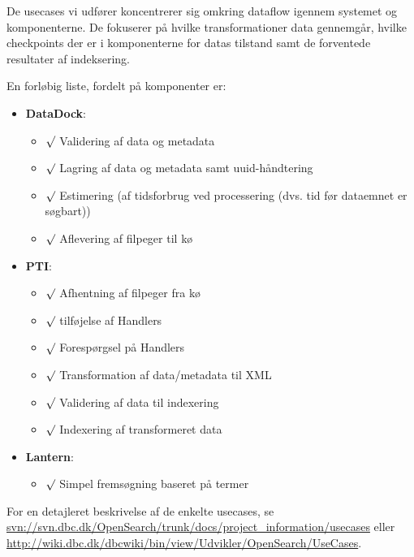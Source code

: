 \documentclass{article}
\begin{document}
De usecases vi udfører koncentrerer sig omkring dataflow igennem
systemet og komponenterne. De fokuserer på hvilke transformationer
data gennemgår, hvilke checkpoints der er i komponenterne for datas
tilstand samt de forventede resultater af indeksering.

En forløbig liste, fordelt på komponenter er:

\begin{itemize}
\item \textbf{DataDock}:\newline
  \begin{itemize}
  \item $\surd$ Validering af data og metadata
  \item $\surd$ Lagring af data og metadata samt uuid-håndtering
  \item $\surd$ Estimering (af tidsforbrug ved processering (dvs. tid før dataemnet er søgbart))
  \item $\surd$ Aflevering af filpeger til kø
  \end{itemize}

\item \textbf{PTI}: \newline
  \begin{itemize}
  \item $\surd$ Afhentning af filpeger fra kø
  \item $\surd$ tilføjelse af Handlers
  \item $\surd$ Forespørgsel på Handlers
  \item $\surd$ Transformation af data/metadata til XML
  \item $\surd$ Validering af data til indexering
  \item $\surd$ Indexering af transformeret data
  \end{itemize}

\item \textbf{Lantern}: \newline
  \begin{itemize}
  \item $\surd$ Simpel fremsøgning baseret på termer
  \end{itemize}

\end{itemize}

For en detajleret beskrivelse af de enkelte usecases, se \url{svn://svn.dbc.dk/OpenSearch/trunk/docs/project_information/usecases} eller \url{http://wiki.dbc.dk/dbcwiki/bin/view/Udvikler/OpenSearch/UseCases}.
\end{document}
